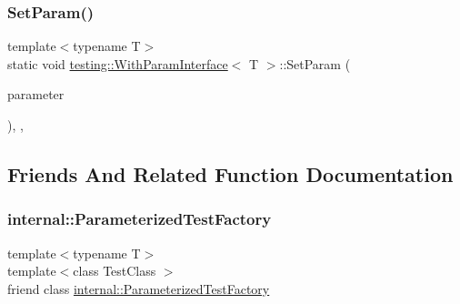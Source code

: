 \mbox{\label{classtesting_1_1WithParamInterface_a471e12a61e83347675b649465bc5aabc}} 
\subsubsection{\texorpdfstring{Set\+Param()}{SetParam()}}
{\footnotesize\ttfamily template$<$typename T$>$ \\
static void \hyperlink{classtesting_1_1WithParamInterface}{testing\+::\+With\+Param\+Interface}$<$ T $>$\+::Set\+Param (\begin{DoxyParamCaption}\item[{const \hyperlink{classtesting_1_1WithParamInterface_a343febaaebf1f025bda484f841d4fec1}{Param\+Type} $\ast$}]{parameter }\end{DoxyParamCaption})\hspace{0.3cm}{\ttfamily [inline]}, {\ttfamily [static]}, {\ttfamily [private]}}



\subsection{Friends And Related Function Documentation}
\mbox{\label{classtesting_1_1WithParamInterface_a7543eb7df89f00fff517dba24bc11dd5}} 
\subsubsection{\texorpdfstring{internal\+::\+Parameterized\+Test\+Factory}{internal::ParameterizedTestFactory}}
{\footnotesize\ttfamily template$<$typename T$>$ \\
template$<$class Test\+Class $>$ \\
friend class \hyperlink{classtesting_1_1internal_1_1ParameterizedTestFactory}{internal\+::\+Parameterized\+Test\+Factory}\hspace{0.3cm}{\ttfamily [friend]}}



